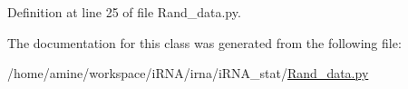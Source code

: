 \-Definition at line 25 of file \-Rand\-\_\-data.\-py.



\-The documentation for this class was generated from the following file\-:\begin{DoxyCompactItemize}
\item 
/home/amine/workspace/i\-R\-N\-A/irna/i\-R\-N\-A\-\_\-stat/\hyperlink{Rand__data_8py}{\-Rand\-\_\-data.\-py}\end{DoxyCompactItemize}
